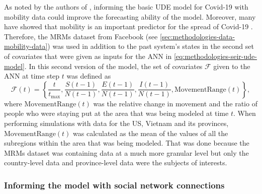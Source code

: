 As noted by the authors of \cite{dandekarMachineLearningAidedGlobal2020a}, informing the basic \gls{UDE} model for Covid-19 with mobility data could improve the forecasting ability of the model.
Moreover, many have showed that mobility is an important predictor for the spread of Covid-19 \cite{changMobilityNetworkModels2021,ihmecovid-19forecastingteamModelingCOVID19Scenarios2021,liSubstantialUndocumentedInfection2020}.
Therefore, the \glspl{MRM} dataset from Facebook (see \autoref{sec:methodologies-data-mobility-data}) was used in addition to the past system's states in the second set of covariates that were given as inputs for the \gls{ANN} in \autoref{eq:methodologies-seir-ude-model}.
In this second version of the model, the set of covariates $\mathcal{F}$ given to the \gls{ANN} at time step $t$ was defined as
\begin{equation}
    \mathcal{F}(t) = \left\lbrace \frac{t}{t_\text{max}}, \frac{S(t-1)}{N(t-1)}, \frac{E(t-1)}{N(t-1)}, \frac{I(t-1)}{N(t-1)}, \text{MovementRange}(t) \right\rbrace,
\end{equation}
where $\text{MovementRange}(t)$ was the relative change in movement and the ratio of people who were staying put at the area that was being modeled at time $t$.
When performing simulations with data for the \gls{US}, Vietnam and its provinces, $\text{MovementRange}(t)$ was calculated as the mean of the values of all the subregions within the area that was being modeled.
That was done because the \glspl{MRM} dataset was containing data at a much more granular level but only the country-level data and province-level data were the subjects of interests.

\subsubsection{Informing the model with social network connections}

